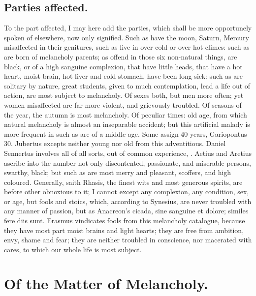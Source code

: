 {{\subsection{Parties affected.}
To the part affected, I may here add the parties,
which shall be more opportunely spoken of elsewhere, now only
signified. Such as have the moon, Saturn, Mercury misaffected in their
genitures, such as live in over cold or over hot climes: such as are
born of melancholy parents; as offend in those six non-natural things,
are black, or of a high sanguine complexion, that have little
heads, that have a hot heart, moist brain, hot liver and cold stomach,
have been long sick: such as are solitary by nature, great students,
given to much contemplation, lead a life out of action, are most
subject to melancholy. Of sexes both, but men more often; yet
women misaffected are far more violent, and grievously troubled.
Of seasons of the year, the autumn is most melancholy. Of peculiar
times: old age, from which natural melancholy is almost an inseparable
accident; but this artificial malady is more frequent in such as are of
a middle age. Some assign 40 years, Gariopontus 30. Jubertus
excepts neither young nor old from this adventitious. Daniel Sennertus
involves all of all sorts, out of common experience, . Aetius and
Aretius ascribe into the number not only discontented,
passionate, and miserable persons, swarthy, black; but such as are most
merry and pleasant, scoffers, and high coloured. Generally, saith
Rhasis, the finest wits and most generous spirits, are before
other obnoxious to it; I cannot except any complexion, any condition,
sex, or age, but fools and stoics, which, according to
Synesius, are never troubled with any manner of passion, but as
Anacreon's cicada, sine sanguine et dolore; similes fere diis sunt.
Erasmus vindicates fools from this melancholy catalogue, because they
have most part moist brains and light hearts; they are free from
ambition, envy, shame and fear; they are neither troubled in
conscience, nor macerated with cares, to which our whole life is most
subject.

\section{Of the Matter of Melancholy.}\label{sec:matter-of-melancholy}

}}
